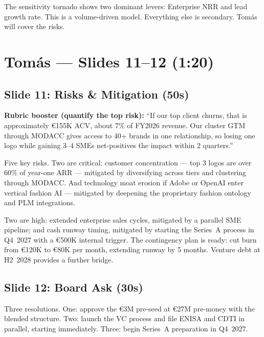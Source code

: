\documentclass[11pt,a4paper]{article}
\begin{document}
The sensitivity tornado shows two dominant levers: Enterprise NRR and lead growth rate. This is a volume-driven model. Everything else is secondary. Tom\'{a}s will cover the risks.

\section{Tom\'{a}s --- Slides 11--12 (1:20)}

\subsection{Slide 11: Risks \& Mitigation (\texttildelow50s)}

\colorbox{artiso!10}{\parbox{\dimexpr\textwidth-2\fboxsep}{%
\small\color{artiso}\textbf{Rubric booster (quantify the top risk):} ``If our top client churns, that is approximately \euro{}155K ACV, about 7\% of FY2026 revenue. Our cluster GTM through MODACC gives access to 40+ brands in one relationship, so losing one logo while gaining 3--4 SMEs net-positives the impact within 2 quarters.''
}}\vspace{4pt}

Five key risks. Two are critical: customer concentration --- top 3 logos are over 60\% of year-one ARR --- mitigated by diversifying across tiers and clustering through MODACC. And technology moat erosion if Adobe or OpenAI enter vertical fashion AI --- mitigated by deepening the proprietary fashion ontology and PLM integrations.

Two are high: extended enterprise sales cycles, mitigated by a parallel SME pipeline; and cash runway timing, mitigated by starting the Series~A process in Q4~2027 with a \euro{}500K internal trigger. The contingency plan is ready: cut burn from \euro{}120K to \euro{}80K per month, extending runway by 5 months. Venture debt at H2~2028 provides a further bridge.

\subsection{Slide 12: Board Ask (\texttildelow30s)}

Three resolutions. One: approve the \euro{}3M pre-seed at \euro{}27M pre-money with the blended structure. Two: launch the VC process and file ENISA and CDTI in parallel, starting immediately. Three: begin Series~A preparation in Q4~2027.
\end{document}
